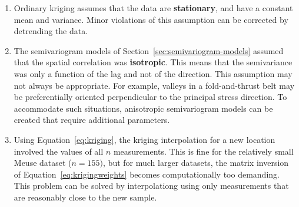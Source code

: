 \begin{enumerate}
\item Ordinary kriging assumes that the data are \textbf{stationary},
  and have a constant mean and variance. Minor violations of this
  assumption can be corrected by detrending the data.
\item The semivariogram models of
  Section~\ref{sec:semivariogram-models} assumed that the spatial
  correlation was \textbf{iso\-tro\-pic}. This means that the
  semivariance was only a function of the lag and not of the
  direction. This assumption may not always be appropriate. For
  example, valleys in a fold-and-thrust belt may be preferentially
  oriented perpendicular to the principal stress direction. To
  accommodate such situations, anisotropic semivariogram models can be
  created that require additional parameters.
\item Using Equation~\ref{eq:kriging}, the kriging interpolation for a
  new location involved the values of all $n$ measurements.  This is
  fine for the relatively small Meuse dataset ($n=155)$, but for much
  larger datasets, the matrix inversion of
  Equation~\ref{eq:krigingweights} becomes computationally too
  demanding.  This problem can be solved by interpolationg using only
  measurements that are reasonably close to the new sample.
\end{enumerate}
